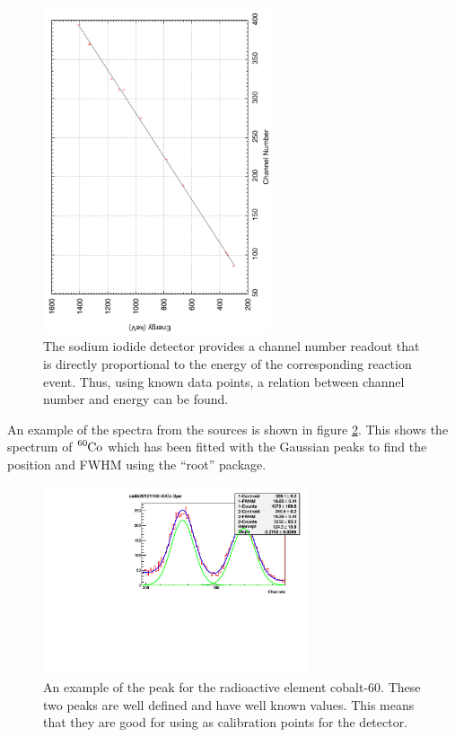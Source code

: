 \begin{figure}[ht]
	\centering
	\includegraphics[angle=270,width=0.6\textwidth]{calibration1NaI.pdf}
	\caption{The sodium iodide detector provides a channel number readout that is directly proportional to the energy of the corresponding reaction event. Thus, using known data points, a relation between channel number and energy can be found.\label{fig:naicalib}}
\end{figure}
An example of the spectra from the sources is shown in figure \ref{fig:cobaltcalib}. This shows the spectrum of $\ce{^{60}Co}$ which has been fitted with the Gaussian peaks to find the position and FWHM using the ``root'' package.

\begin{figure}[ht]
	\centering
	\includegraphics[width=0.7\textwidth]{calib20121113-60Co.pdf}
	\caption{An example of the peak for the radioactive element cobalt-60. These two peaks are well defined and have well known values. This means that they are good for using as calibration points for the detector.\label{fig:cobaltcalib}}
\end{figure}

